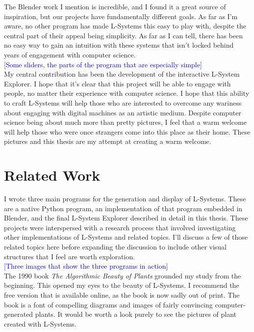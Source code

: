 \documentclass[12pt,twoside]{reedthesis}
\begin{document}
	The Blender work I mention is incredible, and I found it a great source of inspiration, but our projects have fundamentally different goals. As far as I'm aware, no other program has made L-Systems this easy to play with, despite the central part of their appeal being simplicity. As far as I can tell, there has been no easy way to gain an intuition with these systems that isn't locked behind years of engagement with computer science.\\
	
	\textcolor{blue}{[Some sliders, the parts of the program that are especially simple]}\\
	
	My central contribution has been the development of the interactive L-System Explorer. I hope that it's clear that this project will be able to engage with people, no matter their experience with computer science. I hope that this ability to craft L-Systems will help those who are interested to overcome any wariness about engaging with digital machines as an artistic medium. Despite computer science being about much more than pretty pictures, I feel that a warm welcome will help those who were once strangers come into this place as their home. These pictures and this thesis are my attempt at creating a warm welcome.

\section{Related Work}
	I wrote three main programs for the generation and display of L-Systems. These are a native Python program, an implementation of that program embedded in Blender, and the final L-System Explorer described in detail in this thesis. These projects were interspersed with a research process that involved investigating other implementations of L-Systems and related topics. I'll discuss a few of those related topics here before expanding the discussion to include other visual structures that I feel are worth exploration.\\
	
	\textcolor{blue}{[Three images that show the three programs in action]}\\

	The 1990 book \textit{The Algorithmic Beauty of Plants} grounded my study from the beginning. This opened my eyes to the beauty of L-Systems. I recommend the free version that is available online, as the book is now sadly out of print. The book is a font of compelling diagrams and images of fairly convincing computer-generated plants. It would be worth a look purely to see the pictures of plant created with L-Systems.\\
	
\end{document}
